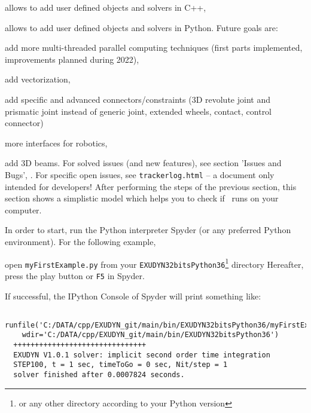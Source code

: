   \item allows to add user defined objects and solvers in C++,
  \item allows to add user defined objects and solvers in Python.
\ei
Future goals are:
\bi
  \item add more multi-threaded parallel computing techniques (first parts implemented, improvements planned during 2022),
  \item add vectorization,
  \item add specific and advanced connectors/constraints (3D revolute joint and prismatic joint instead of generic joint, extended wheels, contact, control connector)
  \item more interfaces for robotics,
  \item add 3D beams.
\ei
For solved issues (and new features), see section 'Issues and Bugs', .
For specific open issues, see \texttt{trackerlog.html} -- a document only intended for developers!
%
After performing the steps of the previous section, this section shows a simplistic model which helps you to check if \codeName\ runs on your computer.

In order to start, run the Python interpreter Spyder (or any preferred Python environment).
For the following example, 
\bi
{}
\item open \texttt{myFirstExample.py} from your \texttt{EXUDYN32bitsPython36}\footnote{or any other directory according to your Python version} directory
\ei
Hereafter, press the play button or \texttt{F5} in Spyder.
%

If successful, the IPython Console of Spyder will print something like:
\begin{lstlisting}
  runfile('C:/DATA/cpp/EXUDYN_git/main/bin/EXUDYN32bitsPython36/myFirstExample.py', 
    wdir='C:/DATA/cpp/EXUDYN_git/main/bin/EXUDYN32bitsPython36')
  +++++++++++++++++++++++++++++++
  EXUDYN V1.0.1 solver: implicit second order time integration
  STEP100, t = 1 sec, timeToGo = 0 sec, Nit/step = 1
  solver finished after 0.0007824 seconds.
\end{lstlisting}

